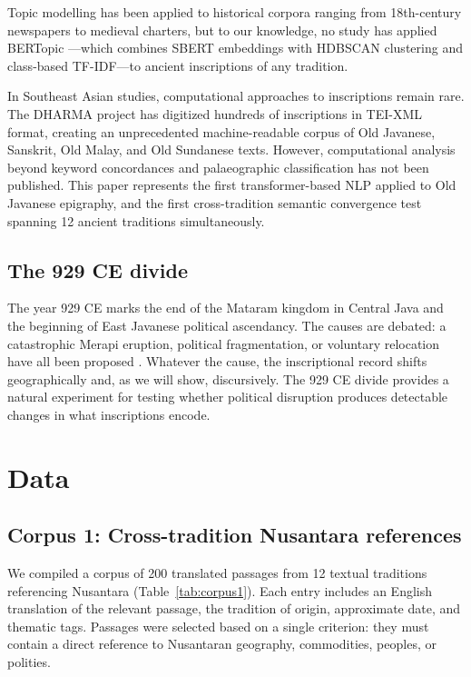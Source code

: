 \documentclass[12pt]{article}
\begin{document}
Topic modelling has been applied to historical corpora ranging from 18th-century newspapers \citep{Blei2003} to medieval charters, but to our knowledge, no study has applied BERTopic \citep{Grootendorst2022}---which combines SBERT embeddings with HDBSCAN clustering and class-based TF-IDF---to ancient inscriptions of any tradition.

In Southeast Asian studies, computational approaches to inscriptions remain rare.
The DHARMA project \citep{DHARMA2024} has digitized hundreds of inscriptions in TEI-XML format, creating an unprecedented machine-readable corpus of Old Javanese, Sanskrit, Old Malay, and Old Sundanese texts.
However, computational analysis beyond keyword concordances and palaeographic classification has not been published.
This paper represents the first transformer-based NLP applied to Old Javanese epigraphy, and the first cross-tradition semantic convergence test spanning 12 ancient traditions simultaneously.

\subsection{The 929 CE divide}

The year 929 CE marks the end of the Mataram kingdom in Central Java and the beginning of East Javanese political ascendancy.
The causes are debated: a catastrophic Merapi eruption, political fragmentation, or voluntary relocation have all been proposed \citep{Degroot2009}.
Whatever the cause, the inscriptional record shifts geographically and, as we will show, discursively.
The 929 CE divide provides a natural experiment for testing whether political disruption produces detectable changes in what inscriptions encode.


\section{Data}

\subsection{Corpus 1: Cross-tradition Nusantara references}

We compiled a corpus of 200 translated passages from 12 textual traditions referencing Nusantara (Table~\ref{tab:corpus1}).
Each entry includes an English translation of the relevant passage, the tradition of origin, approximate date, and thematic tags.
Passages were selected based on a single criterion: they must contain a direct reference to Nusantaran geography, commodities, peoples, or polities.
\end{document}
